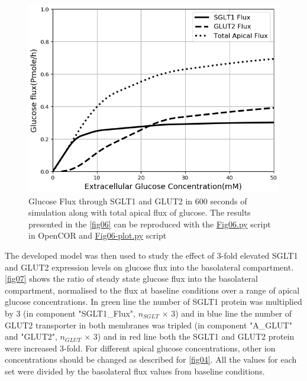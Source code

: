\documentclass[fleqn,10pt]{physiome}
\begin{document}
\begin{figure}[ht]
\centering
\includegraphics[width=0.7\linewidth]{fig06.png}
\caption{Glucose Flux through SGLT1 and GLUT2 in $600$ seconds of simulation along with total apical flux of glucose. The results presented in the \autoref{fig06} can be reproduced with the \href{https://models.physiomeproject.org/workspace/572/file/c052b0c460280139dad150937fbee4fa6a026505/SEDML_files/Fig06.py}{Fig06.py} script in OpenCOR and \href{https://models.physiomeproject.org/workspace/572/file/c052b0c460280139dad150937fbee4fa6a026505/SEDML_files/Fig06_plot.py}{Fig06-plot.py} script}
\label{fig06}
\end{figure}

The developed model was then used to study the effect of 3-fold elevated SGLT1 and GLUT2 expression levels on glucose flux into the basolateral compartment. \autoref{fig07} shows the ratio of steady state glucose flux into the basolateral compartment, normalised to the flux at baseline conditions over a range of apical glucose concentrations. In green line the number of SGLT1 protein was multiplied by 3 (in component "SGLT1\_Flux", $n_{SGLT}$ $\times$ $3$) and in blue line the number of GLUT2 transporter in both membranes was tripled (in component "A\_GLUT" and "GLUT2", $n_{GLUT}$ $\times$ $3$) and in red line both the SGLT1 and GLUT2 protein were increased 3-fold. For different apical glucose concentrations, other ion concentrations should be changed as described for \autoref{fig04}. All the values for each set were divided by the basolateral flux values from baseline conditions.\newpage
\end{document}
